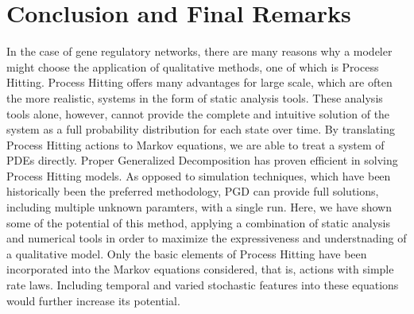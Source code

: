 \documentclass{article}
\begin{document}
\section{Conclusion and Final Remarks}
In the case of gene regulatory networks, there are many reasons why a modeler might choose the application of qualitative methods, one of which is Process Hitting. Process Hitting offers many advantages for large scale, which are often the more realistic, systems in the form of static analysis tools. These analysis tools alone, however, cannot provide the complete and intuitive solution of the system as a full probability distribution for each state over time. By translating Process Hitting actions to Markov equations, we are able to treat a system of PDEs directly. Proper Generalized Decomposition has proven efficient in solving Process Hitting models. As opposed to simulation techniques, which have been historically been the preferred methodology, PGD can provide full solutions, including multiple unknown paramters, with a single run. Here, we have shown some of the potential of this method, applying a combination of static analysis and numerical tools in order to maximize the expressiveness and understnading of a qualitative model. Only the basic elements of Process Hitting have been incorporated into the Markov equations considered, that is, actions with simple rate laws. Including temporal and varied stochastic features into these equations would further increase its potential.



\end{document}
